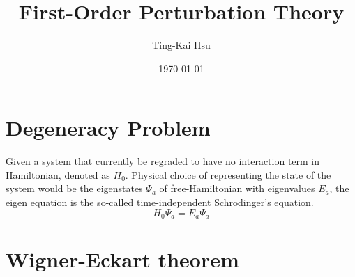 \documentclass[12pt]{article}
\title{First-Order Perturbation Theory}
\author{Ting-Kai Hsu}
\date{\today}
\numberwithin{equation}{section}
\begin{document}
\maketitle
\tableofcontents
\section{Degeneracy Problem}
Given a system that currently be regraded to have no interaction term in Hamiltonian, denoted as $H_0$.
Physical choice of representing the state of the system would be the eigenstates $\Psi_{a}$ of free-Hamiltonian with eigenvalues $E_{a}$, the eigen equation is the so-called time-independent Schr$\ddot{\text{o}}$dinger's equation.
\begin{equation}
    H_0\Psi_{a} = E_{a}\Psi_{a}
\end{equation}
\section{Wigner-Eckart theorem}
\end{document}

